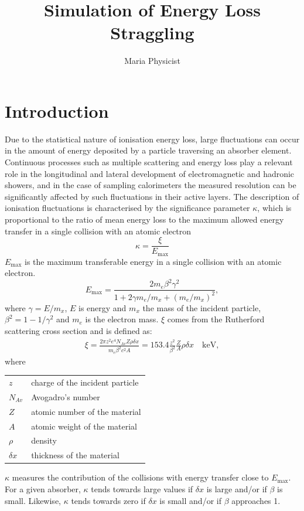 \documentclass{article}
\title{Simulation of  Energy Loss  Straggling}
\author{Maria Physicist}
\newcommand{\Emax}{\ensuremath{E_{\mathrm{max}}}}
\begin{document}
\maketitle

\section{Introduction}

Due to the statistical nature of ionisation energy loss, large
fluctuations can occur in the amount of energy deposited by a particle
traversing an absorber element.  Continuous processes such as multiple
scattering and energy loss play a relevant role in the longitudinal
and lateral development of electromagnetic and hadronic
showers, and in the case of sampling calorimeters the
measured resolution can be significantly affected by such fluctuations
in their active layers.  The description of ionisation fluctuations is
characterised by the significance parameter $\kappa$, which is
proportional to the ratio of mean energy loss to the maximum allowed
energy transfer in a single collision with an atomic electron
\[
\kappa =\frac{\xi}{\Emax}
\]
\Emax{}
is the maximum transferable energy in a single collision with
an atomic electron.
\[
\Emax =\frac{2 m_e \beta^2\gamma^2 }
{1 +  2\gamma m_e/m_x + \left ( m_e/m_x\right)^2},
\]
where $\gamma = E/m_x$, $E$ is energy and
$m_x$ the mass of the incident particle, 
$\beta^2 = 1 - 1/\gamma^2$ and $m_e$ is the electron mass. 
$\xi$ comes from the Rutherford scattering cross  section
and is defined as:
\begin{eqnarray*} \xi  = \frac{2\pi z^2 e^4 N_{Av} Z \rho \delta x}
        {m_e \beta^2 c^2 A} =  153.4 \frac{z^2} {\beta^2} \frac{Z}{A}
  \rho \delta x \quad\mathrm{keV},
\end{eqnarray*}
where

\begin{tabular}{ll}
$z$          & charge of the incident particle \\
$N_{Av}$     & Avogadro's number \\
$Z$          & atomic number of the material \\
$A$          & atomic weight of the material \\
$\rho$       & density \\
$ \delta x$  & thickness of the material \\
\end{tabular}

$\kappa$ measures the contribution of the collisions with energy
transfer close to \Emax.  For a given absorber, $\kappa$ tends
towards large values if $\delta x$ is large and/or if $\beta$ is
small.  Likewise, $\kappa$ tends towards zero if $\delta x $ is small
and/or if $\beta$ approaches 1.
\end{document}
